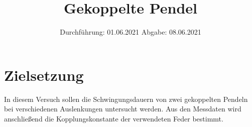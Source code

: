 

\subject{V106}
\title{Gekoppelte Pendel}
\date{
    Durchführung: 01.06.2021
    \hspace{3em}
    Abgabe: 08.06.2021
}



\maketitle
\thispagestyle{empty}
\tableofcontents
\newpage

\section{Zielsetzung}

    In diesem Versuch sollen die Schwingungsdauern von zwei gekoppelten Pendeln bei verschiedenen Auslenkungen untersucht werden.
    Aus den Messdaten wird anschließend die Kopplungskonstante der verwendeten Feder bestimmt.


\clearpage


\clearpage


\clearpage


\clearpage

\printbibliography



